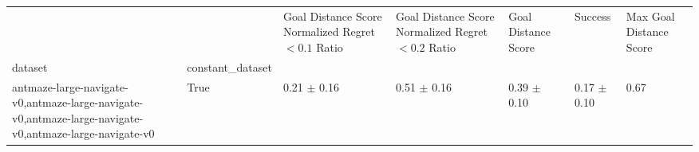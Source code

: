 \begin{tabular}{lllllll}
\toprule
 &  & Goal Distance Score Normalized Regret $< 0.1$ Ratio & Goal Distance Score Normalized Regret $< 0.2$ Ratio & Goal Distance Score & Success & Max Goal Distance Score \\
dataset & constant_dataset &  &  &  &  &  \\
\midrule
antmaze-large-navigate-v0,antmaze-large-navigate-v0,antmaze-large-navigate-v0,antmaze-large-navigate-v0 & True & 0.21 $\pm$ 0.16 & 0.51 $\pm$ 0.16 & 0.39 $\pm$ 0.10 & 0.17 $\pm$ 0.10 & 0.67 \\
\cline{1-7}
\bottomrule
\end{tabular}
